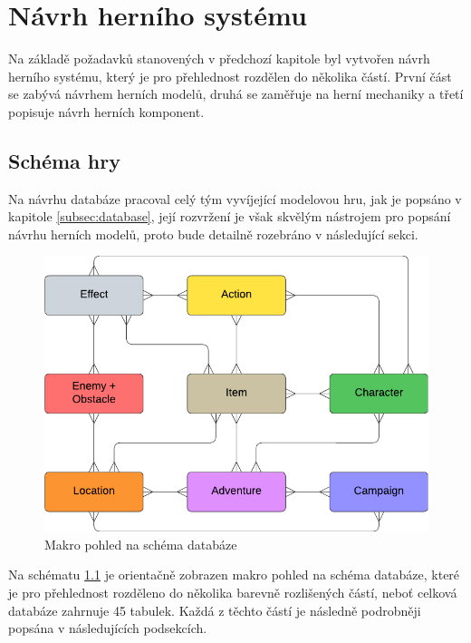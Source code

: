 \chapter{Návrh herního systému}
\label{chap:design}

Na základě požadavků stanovených v předchozí kapitole byl vytvořen návrh herního systému, který je pro přehlednost rozdělen do několika částí. První část se zabývá návrhem herních modelů, druhá se zaměřuje na herní mechaniky a třetí popisuje návrh herních komponent.


\section{Schéma hry}
\label{sec:design_scheme}

Na návrhu databáze pracoval celý tým vyvíjející modelovou hru, jak je popsáno v kapitole \ref{subsec:database}, její rozvržení je však skvělým nástrojem pro popsání návrhu herních modelů, proto bude detailně rozebráno v následující sekci.

\begin{figure}[h]
    \centering
    \includegraphics[scale=0.95]{../../shared/diagrams/er_macro.pdf}
    \caption{Makro pohled na schéma databáze}
    \label{diag:er_macro}
\end{figure}

Na schématu \ref{diag:er_macro} je orientačně zobrazen makro pohled na schéma databáze, které je pro přehlednost rozděleno do několika barevně rozlišených částí, neboť celková databáze zahrnuje 45 tabulek. Každá z těchto částí je následně podrobněji popsána v následujících podsekcích.


